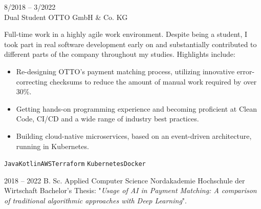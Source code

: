 \documentclass[9pt]{developercv} %
\begin{document}
\begin{entrylist}
{    }
	\entry
		{8/2018 -- 3/2022\\}
		{Dual Student}
		{OTTO GmbH \& Co. KG}
		{Full-time work in a highly agile work environment. Despite being a student, I took part in real software development early on and substantially contributed to different parts of the company throughout my studies. Highlights include:
        \begin{itemize}
            \item Re-designing OTTO's payment matching process, utilizing innovative error-correcting checksums to reduce the amount of manual work required by over 30\%.
            \item Getting hands-on programming experience and becoming proficient at Clean Code, CI/CD and a wide range of industry best practices.
            \item Building cloud-native microservices, based on an event-driven architecture, running in Kubernetes.
        \end{itemize}
        \texttt{Java}\slashsep\texttt{Kotlin}\slashsep\texttt{AWS}\slashsep\texttt{Terraform}
        \texttt{Kubernetes}\slashsep\texttt{Docker}
        }
\end{entrylist}



\begin{entrylist}
	\entry
		{2018 -- 2022}
		{B. Sc. Applied Computer Science}
		{Nordakademie Hochschule der Wirtschaft}
		{Bachelor's Thesis: "\textit{Usage of AI in Payment Matching: A comparison of traditional algorithmic approaches with Deep Learning}".}
\end{entrylist}



\end{document}
